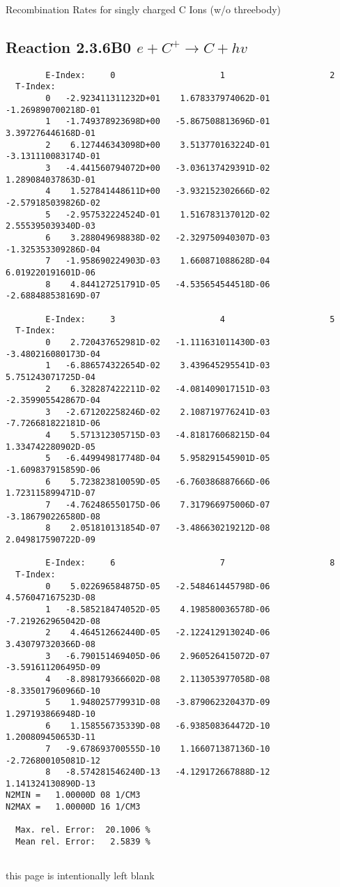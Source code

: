 \documentclass[12pt,dvipdfmx]{article}
\begin{document}
  Recombination Rates for singly charged C Ions (w/o threebody)
\subsection{
Reaction 2.3.6B0  $e + C^{+} \rightarrow C + hv$
}

\begin{small}\begin{verbatim}
        E-Index:     0                     1                     2
  T-Index:
        0   -2.923411311232D+01    1.678337974062D-01   -1.269890700218D-01
        1   -1.749378923698D+00   -5.867508813696D-01    3.397276446168D-01
        2    6.127446343098D+00    3.513770163224D-01   -3.131110083174D-01
        3   -4.441560794072D+00   -3.036137429391D-02    1.289084037863D-01
        4    1.527841448611D+00   -3.932152302666D-02   -2.579185039826D-02
        5   -2.957532224524D-01    1.516783137012D-02    2.555395039340D-03
        6    3.288049698838D-02   -2.329750940307D-03   -1.325353309286D-04
        7   -1.958690224903D-03    1.660871088628D-04    6.019220191601D-06
        8    4.844127251791D-05   -4.535654544518D-06   -2.688488538169D-07

        E-Index:     3                     4                     5
  T-Index:
        0    2.720437652981D-02   -1.111631011430D-03   -3.480216080173D-04
        1   -6.886574322654D-02    3.439645295541D-03    5.751243071725D-04
        2    6.328287422211D-02   -4.081409017151D-03   -2.359905542867D-04
        3   -2.671202258246D-02    2.108719776241D-03   -7.726681822181D-06
        4    5.571312305715D-03   -4.818176068215D-04    1.334742280902D-05
        5   -6.449949817748D-04    5.958291545901D-05   -1.609837915859D-06
        6    5.723823810059D-05   -6.760386887666D-06    1.723115899471D-07
        7   -4.762486550175D-06    7.317966975006D-07   -3.186790226580D-08
        8    2.051810131854D-07   -3.486630219212D-08    2.049817590722D-09

        E-Index:     6                     7                     8
  T-Index:
        0    5.022696584875D-05   -2.548461445798D-06    4.576047167523D-08
        1   -8.585218474052D-05    4.198580036578D-06   -7.219262965042D-08
        2    4.464512662440D-05   -2.122412913024D-06    3.430797320366D-08
        3   -6.790151469405D-06    2.960526415072D-07   -3.591611206495D-09
        4   -8.898179366602D-08    2.113053977058D-08   -8.335017960966D-10
        5    1.948025779931D-08   -3.879062320437D-09    1.297193866948D-10
        6    1.158556735339D-08   -6.938508364472D-10    1.200809450653D-11
        7   -9.678693700555D-10    1.166071387136D-10   -2.726800105081D-12
        8   -8.574281546240D-13   -4.129172667888D-12    1.141324130890D-13
N2MIN =   1.00000D 08 1/CM3
N2MAX =   1.00000D 16 1/CM3

  Max. rel. Error:  20.1006 %
  Mean rel. Error:   2.5839 %


\end{verbatim}\end{small}
\newpage
this page is intentionally left blank
\newpage
\end{document}

